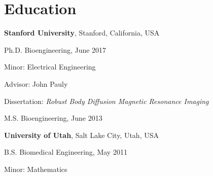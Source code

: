 \section{\sc Education}

 {\bf Stanford University}, Stanford, California, USA\\
\vspace*{-.1in}
\begin{list1}
    \item[] Ph.D. Bioengineering, June 2017
    \begin{list2}
        \item Minor:  Electrical Engineering
        \item Advisor: John Pauly
        \item Dissertation: \emph{Robust Body Diffusion Magnetic Resonance Imaging}
    \end{list2}
    \vspace*{.05in}

    \item[] M.S. Bioengineering, June 2013

\end{list1}



{\bf University of Utah}, Salt Lake City, Utah, USA\\
\vspace*{-.1in}
\begin{list1}
    \item[] B.S. Biomedical Engineering, May 2011 %

    \begin{list2}
        \item Minor:  Mathematics
    \end{list2}
\end{list1}


\endinput